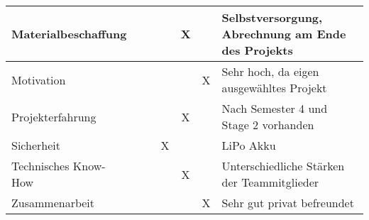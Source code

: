 \begin{table}[H]
{\begin{tabular}{|l|c|c|c|c|c|l|}
    Materialbeschaffung    &             &            &            & X          &             & Selbstversorgung,   Abrechnung am Ende des Projekts \\ \hline
    Motivation             &             &            &            &            & X           & Sehr hoch, da eigen   ausgewähltes Projekt          \\ \hline
    Projekterfahrung       &             &            &            & X          &             & Nach Semester 4 und Stage   2 vorhanden             \\ \hline
    Sicherheit             &             &            & X          &            &             & LiPo Akku                                           \\ \hline
    Technisches Know-How   &             &            &            & X          &             & Unterschiedliche Stärken   der Teammitglieder       \\ \hline
    Zusammenarbeit         &             &            &            &            & X           & Sehr gut privat   befreundet                 \\ \hline
    \end{tabular}%
    }
    \label{tab:StaerkenSchwaechenAnalyse}
    \end{table}